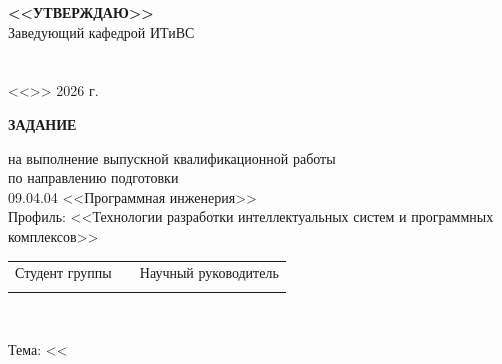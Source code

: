 \begingroup


\fontsize{12pt}{10pt}
\selectfont
\renewcommand{\arraystretch}{1}



{}

\vkrStandartHead

\vspace{1cm}

\hfill%
\begin{minipage}{0.5\linewidth}
	\raggedleft
	\textbf{<<УТВЕРЖДАЮ>>}\\
	Заведующий кафедрой ИТиВС\\
	\vkrKafedraHeadTitles\space\vkrKafedraHeadShort\\[3ex]
	\underline{\hspace{30mm}}\\
	<<\underline{\hspace{7mm}}>>\underline{\hspace{30mm}} 2026 г.
\end{minipage}

\vspace{0.5cm}

\begin{center}
	{\fontsize{14pt}{30pt}\selectfont\textbf{ЗАДАНИЕ}} \vspace{3pt}

	на выполнение выпускной квалификационной работы \\
	по направлению подготовки \\
	09.04.04 <<Программная инженерия>>\\
	Профиль: <<Технологии разработки интеллектуальных систем и программных комплексов>>
\end{center}

{
	\centering\fontsize{14pt}{12pt}\selectfont
	\begin{tabular} {l l l}
		Студент группы \vkrStudentGroup    	& \hspace{1cm} &  	Научный руководитель \\
		\vkrStudentShort					&              & 	\insertPersonInfo{Advisor} \vkrAdvisorShort\\
	\end{tabular}\\
}

\begin{center}
	\fontsize{14pt}{12pt}\selectfont
	\parbox{0.90\linewidth}{\centering Тема: <<\vkrTheme}

\end{center}

